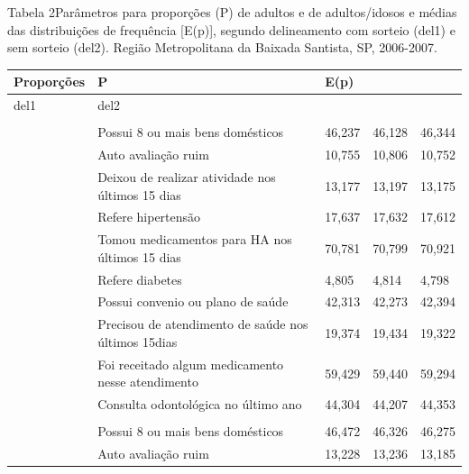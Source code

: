 \documentclass{article}
\begin{document}
Tabela 2Parâmetros para proporções (P) de adultos e de adultos/idosos e médias
das distribuições de frequência [E(p)], segundo delineamento com sorteio (del1)
e sem sorteio (del2). Região Metropolitana da Baixada Santista, SP, 2006-2007.
\begin{table}
\begin{xtabular}{ l | l | l l | l }
\hline
Proporções & P & E(p) \\ \hline
del1 & del2\\ \hline
{}
&
&
\\ \hline

& Possui 8 ou mais bens domésticos
& 46,237
& 46,128
& 46,344
\\ \hline

& Auto avaliação ruim
& 10,755
& 10,806
& 10,752
\\ \hline

& Deixou de realizar atividade nos últimos 15 dias
& 13,177
& 13,197
& 13,175
\\ \hline

& Refere hipertensão
& 17,637
& 17,632
& 17,612
\\ \hline

& Tomou medicamentos para HA nos últimos 15 dias
& 70,781
& 70,799
& 70,921
\\ \hline

& Refere diabetes
& 4,805
& 4,814
& 4,798
\\ \hline

& Possui convenio ou plano de saúde
& 42,313
& 42,273
& 42,394
\\ \hline

& Precisou de atendimento de saúde nos últimos 15dias
& 19,374
& 19,434
& 19,322
\\ \hline

& Foi receitado algum medicamento nesse atendimento
& 59,429
& 59,440
& 59,294
\\ \hline

& Consulta odontológica no último ano
& 44,304
& 44,207
& 44,353
\\ \hline

&
&
\\ \hline

& Possui 8 ou mais bens domésticos
& 46,472
& 46,326
& 46,275
\\ \hline

& Auto avaliação ruim
& 13,228
& 13,236
& 13,185
\\ \hline


\end{xtabular}
\end{table}
\end{document}
